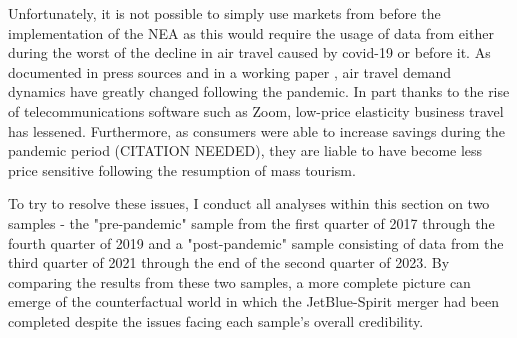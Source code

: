 \documentclass{article}
\begin{document}
	Unfortunately, it is not possible to simply use markets from before the implementation of the NEA as this would require the usage of data from either during the worst of the decline in air travel caused by covid-19 or before it. As documented in press sources and in a working paper \citep{ewen_zoom_2023}, air travel demand dynamics have greatly changed following the pandemic. In part thanks to the rise of telecommunications software such as Zoom, low-price elasticity business travel has lessened. Furthermore, as consumers were able to increase savings during the pandemic period (CITATION NEEDED), they are liable to have become less price sensitive following the resumption of mass tourism. 
	
 	To try to resolve these issues, I conduct all analyses within this section on two samples - the "pre-pandemic" sample from the first quarter of 2017 through the fourth quarter of  2019 and a "post-pandemic" sample consisting of data from the third quarter of 2021 through the end of the second quarter of 2023. By comparing the results from these two samples, a more complete picture can emerge of the counterfactual world in which the JetBlue-Spirit merger had been completed despite the issues facing each sample's overall credibility.  
 	 	 
 	 
 	 
\end{document}
